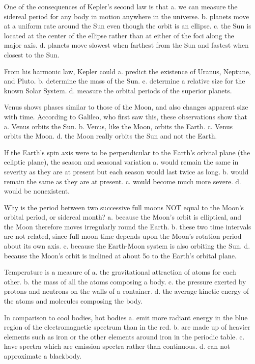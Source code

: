     One of the consequences of Kepler's second law is that
    a. we can measure the sidereal period for any body in motion anywhere in the universe.
    b. planets move at a uniform rate around the Sun even though the orbit is an ellipse.
    c. the Sun is located at the center of the ellipse rather than at either of the foci along the major axis.
    d. planets move slowest when farthest from the Sun and fastest when closest to the Sun.

    From his harmonic law, Kepler could
    a. predict the existence of Uranus, Neptune, and Pluto.
    b. determine the mass of the Sun.
    c. determine a relative size for the known Solar System.
    d. measure the orbital periods of the superior planets.

    Venus shows phases similar to those of the Moon, and also changes apparent size with time. According to Galileo, who first saw this, these observations show that
    a. Venus orbits the Sun.
    b. Venus, like the Moon, orbits the Earth.
    c. Venus orbits the Moon.
    d. the Moon really orbits the Sun and not the Earth.

    If the Earth's spin axis were to be perpendicular to the Earth's orbital plane (the ecliptic plane), the season and seasonal variation
    a. would remain the same in severity as they are at present but each season would last twice as long.
    b. would remain the same as they are at present.
    c. would become much more severe.
    d. would be nonexistent.

    Why is the period between two successive full moons NOT equal to the Moon's orbital period, or sidereal month?
    a. because the Moon's orbit is elliptical, and the Moon therefore moves irregularly round the Earth.
    b. these two time intervals are not related, since full moon time depends upon the Moon's rotation period about its own axis.
    c. because the Earth-Moon system is also orbiting the Sun.
    d. because the Moon's orbit is inclined at about 5o to the Earth's orbital plane.

    Temperature is a measure of
    a. the gravitational attraction of atoms for each other.
    b. the mass of all the atoms composing a body.
    c. the pressure exerted by protons and neutrons on the walls of a container.
    d. the average kinetic energy of the atoms and molecules composing the body.

    In comparison to cool bodies, hot bodies
    a. emit more radiant energy in the blue region of the electromagnetic spectrum than in the red.
    b. are made up of heavier elements such as iron or the other elements around iron in the periodic table.
    c. have spectra which are emission spectra rather than continuous.
    d. can not approximate a blackbody.

